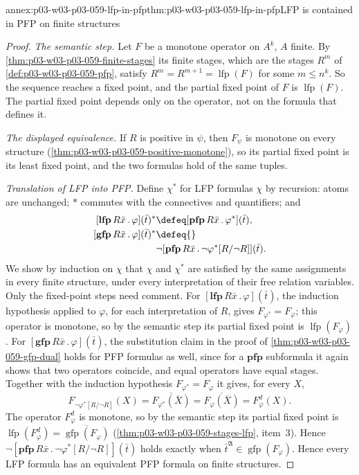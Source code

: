 \begin{annexitem}{annex:p03-w03-p03-059-lfp-in-pfp}{thm:p03-w03-p03-059-lfp-in-pfp}{LFP is contained in PFP on finite structures}
\begin{proof}
\emph{The semantic step.} Let \(F\) be a monotone operator on \(A^k\), \(A\)
finite. By \cref{thm:p03-w03-p03-059-finite-stages} its finite stages,
which are the stages \(R^m\) of \cref{def:p03-w03-p03-059-pfp}, satisfy
\(R^m=R^{m+1}=\operatorname{lfp}(F)\) for some \(m\leq n^k\). So the
sequence reaches a fixed point, and the partial fixed point of \(F\) is
\(\operatorname{lfp}(F)\). The partial fixed point depends only on the
operator, not on the formula that defines it.

\emph{The displayed equivalence.} If \(R\) is positive in \(\psi\), then
\(F_\psi\) is monotone on every structure
(\cref{thm:p03-w03-p03-059-positive-monotone}), so its partial fixed point
is its least fixed point, and the two formulas hold of the same tuples.

\emph{Translation of LFP into PFP.} Define \(\chi^*\) for LFP formulas
\(\chi\) by recursion: atoms are unchanged; \(*\) commutes with the
connectives and quantifiers; and
\[
\begin{aligned}
 [\mathbf{lfp}\,R\bar x\,.\,\varphi](\bar t)^*&\defeq
   [\mathbf{pfp}\,R\bar x\,.\,\varphi^*](\bar t),\\
 [\mathbf{gfp}\,R\bar x\,.\,\varphi](\bar t)^*&\defeq{}\\
   &\neg[\mathbf{pfp}\,R\bar x\,.\,\neg\varphi^*[R/\neg R]](\bar t).
\end{aligned}
\]
We
show by induction on \(\chi\) that \(\chi\) and \(\chi^*\) are satisfied by
the same assignments in every finite structure, under every interpretation
of their free relation variables. Only the fixed-point steps need comment.
For \([\mathbf{lfp}\,R\bar x\,.\,\varphi](\bar t)\), the induction
hypothesis applied to \(\varphi\), for each interpretation of \(R\), gives
\(F_{\varphi^*}=F_\varphi\); this operator is monotone, so by the semantic
step its partial fixed point is \(\operatorname{lfp}(F_\varphi)\). For
\([\mathbf{gfp}\,R\bar x\,.\,\varphi](\bar t)\), the substitution claim in
the proof of \cref{thm:p03-w03-p03-059-gfp-dual} holds for PFP formulas
as well, since for a \(\mathbf{pfp}\) subformula it again shows that two
operators coincide, and equal operators have equal stages. Together with
the induction hypothesis \(F_{\varphi^*}=F_\varphi\) it gives, for every
\(X\),
\[
 F_{\neg\varphi^*[R/\neg R]}(X)=\overline{F_{\varphi^*}(\overline X)}
 =\overline{F_\varphi(\overline X)}=F_\varphi^d(X).
\]
The operator \(F_\varphi^d\) is monotone, so by the semantic step its
partial fixed point is \(\operatorname{lfp}(F_\varphi^d)=
\overline{\operatorname{gfp}(F_\varphi)}\)
(\cref{thm:p03-w03-p03-059-stages-lfp}, item~3). Hence
\(\neg[\mathbf{pfp}\,R\bar x\,.\,\neg\varphi^*[R/\neg R]](\bar t)\) holds
exactly when \(\bar t^{\mathfrak A}\in\operatorname{gfp}(F_\varphi)\). Hence every LFP
formula has an equivalent PFP formula on finite structures.
\end{proof}
\end{annexitem}

